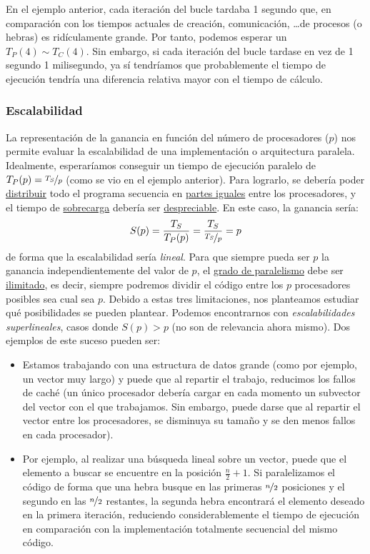 En el ejemplo anterior, cada iteración del bucle tardaba 1 segundo que, en comparación con los tiempos actuales de creación, comunicación, \ldots de procesos (o hebras) es ridículamente grande. Por tanto, podemos esperar un $T_P(4) \sim T_C(4)$. Sin embargo, si cada iteración del bucle tardase en vez de 1 segundo 1 milisegundo, ya sí tendríamos que probablemente el tiempo de ejecución tendría una diferencia relativa mayor con el tiempo de cálculo.

\subsubsection{Escalabilidad}
La representación de la ganancia en función del número de procesadores ($p$) nos permite evaluar la escalabilidad de una implementación o arquitectura paralela. Idealmente, esperaríamos conseguir un tiempo de ejecución paralelo de ${T_P(p) = \nicefrac{T_S}{p}}$ (como se vio en el ejemplo anterior). Para lograrlo, se debería poder \underline{distribuir} todo el programa secuencia en \underline{partes iguales} entre los procesadores, y el tiempo de \underline{sobrecarga} debería ser \underline{despreciable}. En este caso, la ganancia sería:
\begin{equation*}
    S(p) = \dfrac{T_S}{T_P(p)} = \dfrac{T_S}{\nicefrac{T_S}{p}} = p
\end{equation*}
de forma que la escalabilidad sería \emph{lineal}. Para que siempre pueda ser $p$ la ganancia independientemente del valor de $p$, el \underline{grado de paralelismo} debe ser \underline{ilimitado}, es decir, siempre podremos dividir el código entre los $p$ procesadores posibles sea cual sea $p$. Debido a estas tres limitaciones, nos planteamos estudiar qué posibilidades se pueden plantear.
Podemos encontrarnos con \emph{escalabilidades superlineales}, casos donde $S(p)>p$ (no son de relevancia ahora mismo). Dos ejemplos de este suceso pueden ser:\label{ej:superlineal}
\begin{itemize}
    \item Estamos trabajando con una estructura de datos grande (como por ejemplo, un vector muy largo) y puede que al repartir el trabajo, reducimos los fallos de caché (un único procesador debería cargar en cada momento un subvector del vector con el que trabajamos. Sin embargo, puede darse que al repartir el vector entre los procesadores, se disminuya su tamaño y se den menos fallos en cada procesador).
    \item Por ejemplo, al realizar una búsqueda lineal sobre un vector, puede que el elemento a buscar se encuentre en la posición $\frac{n}{2}+1$. Si paralelizamos el código de forma que una hebra busque en las primeras $\nicefrac{n}{2}$ posiciones y el segundo en las $\nicefrac{n}{2}$ restantes, la segunda hebra encontrará el elemento deseado en la primera iteración, reduciendo considerablemente el tiempo de ejecución en comparación con la implementación totalmente secuencial del mismo código.
\end{itemize}
